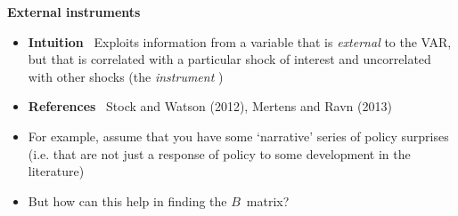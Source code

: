 \documentclass[10pt,english,t,aspectratio=169,ignorenonframetext]{beamer}
\begin{document}
\begin{frame}
\vspace{3cm} \color{title}\bigskip

\color{note}
\end{frame}


\begin{frame}
{\textbf{External instruments}}\bigskip \smallskip

\begin{itemize}
\item \textbf{Intuition} \ Exploits information from a variable that is 
\emph{external} to the VAR, but that is correlated with a particular shock
of interest and uncorrelated with other shocks (the \emph{instrument}%
)\bigskip \medskip

\item \textbf{References} \ Stock and Watson (2012), Mertens and Ravn
(2013)\bigskip \medskip \pause

\item For example, assume that you have some `narrative' series of policy
surprises (i.e. that are not just a response of policy to some development
in the literature)\bigskip \medskip \pause

\item But how can this help in finding the $B$\ matrix?
\end{itemize}
\end{frame}

\end{document}
